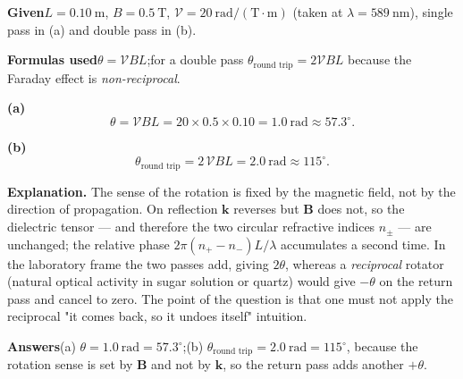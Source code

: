 \documentclass[11pt]{ctexart}
\let\subhdrtheme\subhdr
\renewcommand{\subhdr}[1]{\needspace{3\baselineskip}\subhdrtheme{#1}}
\begin{document}
\textbf{Given}\quad $L=0.10\ \mathrm{m}$, $B=0.5\ \mathrm{T}$, $\mathcal{V}=20\ \mathrm{rad/(T\cdot m)}$
(taken at $\lambda=589\ \mathrm{nm}$), single pass in (a) and double pass in (b).

\textbf{Formulas used}\quad $\theta=\mathcal{V}BL$;\quad for a double pass
$\theta_{\text{round trip}}=2\mathcal{V}BL$ because the Faraday effect is \emph{non-reciprocal}.

\textbf{(a)}
\begin{equation}
\theta=\mathcal{V}BL=20\times0.5\times0.10=1.0\ \mathrm{rad}\approx57.3^\circ .
\end{equation}

\textbf{(b)}
\begin{equation}
\theta_{\text{round trip}}=2\,\mathcal{V}BL=2.0\ \mathrm{rad}\approx115^\circ .
\end{equation}

\textbf{Explanation.} The sense of the rotation is fixed by the magnetic field, not by the direction of
propagation. On reflection $\mathbf{k}$ reverses but $\mathbf{B}$ does not, so the dielectric tensor — and
therefore the two circular refractive indices $n_\pm$ — are unchanged; the relative phase $2\pi(n_+-n_-)L/\lambda$
accumulates a second time. In the laboratory frame the two passes add, giving $2\theta$, whereas a
\emph{reciprocal} rotator (natural optical activity in sugar solution or quartz) would give $-\theta$ on the
return pass and cancel to zero. The point of the question is that one must not apply the reciprocal
"it comes back, so it undoes itself" intuition.

\textbf{Answers}\quad (a) $\theta=1.0\ \mathrm{rad}=57.3^\circ$;\quad (b) $\theta_{\text{round trip}}=2.0\ \mathrm{rad}=115^\circ$,
because the rotation sense is set by $\mathbf{B}$ and not by $\mathbf{k}$, so the return pass adds another $+\theta$.


\end{document}

